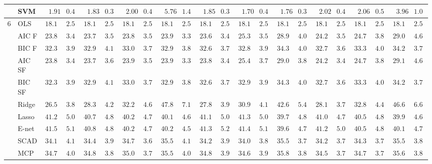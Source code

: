 \begin{tabular}{p{0.2cm}p{1cm}|p{0.6cm}p{0.6cm}|p{0.6cm}p{0.6cm}p{0.6cm}p{0.6cm}p{0.6cm}p{0.6cm}|p{0.6cm}p{0.6cm}p{0.6cm}p{0.6cm}p{0.6cm}p{0.6cm}|p{0.6cm}p{0.6cm}p{0.6cm}p{0.6cm}p{0.6cm}p{0.6cm}}
 & SVM  & $\phantom{0}1.91$ & $0.41$ & $\phantom{0}1.83$ & $0.31$ & $\phantom{0}2.00$ & $0.43$ & $\phantom{0}5.76$ & $1.46$ & $\phantom{0}1.85$ & $0.36$ & $\phantom{0}1.70$ & $0.40$ & $\phantom{0}1.76$ & $0.36$ & $\phantom{0}2.02$ & $0.46$ & $\phantom{0}2.06$ & $0.53$ & $\phantom{0}3.96$ & $1.07$ \\\hline
6 & OLS  & $18.14$ & $2.50$ & $18.14$ & $2.50$ & $18.14$ & $2.50$ & $18.14$ & $2.50$ & $18.14$ & $2.50$ & $18.14$ & $2.50$ & $18.14$ & $2.50$ & $18.14$ & $2.50$ & $18.14$ & $2.50$ & $18.14$ & $2.50$ \\
 & AIC F  & $23.83$ & $3.48$ & $23.76$ & $3.54$ & $23.86$ & $3.54$ & $23.93$ & $3.38$ & $23.68$ & $3.48$ & $25.34$ & $3.59$ & $28.92$ & $4.06$ & $24.25$ & $3.50$ & $24.71$ & $3.89$ & $29.08$ & $4.67$ \\
 & BIC F  & $32.30$ & $3.97$ & $32.93$ & $4.11$ & $33.04$ & $3.79$ & $32.92$ & $3.83$ & $32.64$ & $3.79$ & $32.89$ & $3.97$ & $34.33$ & $4.04$ & $32.79$ & $3.63$ & $33.34$ & $4.02$ & $34.26$ & $3.71$ \\
 & AIC SF  & $23.82$ & $3.44$ & $23.77$ & $3.64$ & $23.99$ & $3.50$ & $23.95$ & $3.35$ & $23.83$ & $3.42$ & $25.43$ & $3.73$ & $29.03$ & $3.89$ & $24.28$ & $3.46$ & $24.75$ & $3.83$ & $29.16$ & $4.62$ \\
 & BIC SF  & $32.33$ & $3.95$ & $32.94$ & $4.10$ & $33.05$ & $3.77$ & $32.92$ & $3.83$ & $32.64$ & $3.79$ & $32.90$ & $3.96$ & $34.35$ & $4.05$ & $32.79$ & $3.64$ & $33.35$ & $4.02$ & $34.26$ & $3.71$ \\
 & Ridge  & $26.57$ & $3.86$ & $28.36$ & $4.25$ & $32.21$ & $4.62$ & $47.81$ & $7.18$ & $27.84$ & $3.96$ & $30.96$ & $4.10$ & $42.65$ & $5.45$ & $28.18$ & $3.73$ & $32.84$ & $4.41$ & $46.66$ & $6.64$ \\
 & Lasso  & $41.22$ & $5.00$ & $40.72$ & $4.83$ & $40.25$ & $4.71$ & $40.19$ & $4.63$ & $41.19$ & $5.05$ & $41.30$ & $5.04$ & $39.70$ & $4.84$ & $41.01$ & $4.79$ & $40.54$ & $4.81$ & $39.99$ & $4.61$ \\
 & E-net  & $41.58$ & $5.16$ & $40.88$ & $4.83$ & $40.26$ & $4.75$ & $40.23$ & $4.53$ & $41.39$ & $5.28$ & $41.48$ & $5.17$ & $39.62$ & $4.78$ & $41.29$ & $5.01$ & $40.52$ & $4.82$ & $40.18$ & $4.77$ \\
 & SCAD  & $34.19$ & $4.18$ & $34.41$ & $3.91$ & $34.73$ & $3.66$ & $35.58$ & $4.12$ & $34.29$ & $3.91$ & $34.03$ & $3.84$ & $35.58$ & $3.79$ & $34.20$ & $3.70$ & $34.30$ & $3.74$ & $35.55$ & $3.83$ \\
 & MCP  & $34.77$ & $4.05$ & $34.83$ & $3.87$ & $35.02$ & $3.77$ & $35.54$ & $4.09$ & $34.80$ & $3.90$ & $34.60$ & $3.95$ & $35.88$ & $3.87$ & $34.55$ & $3.71$ & $34.70$ & $3.78$ & $35.62$ & $3.88$ \\

\end{tabular}
